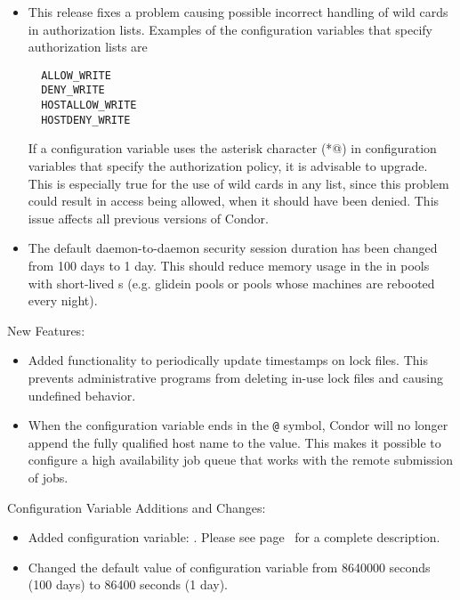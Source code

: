 \begin{itemize}

\item This release fixes a problem causing possible incorrect handling
of wild cards in authorization lists.
Examples of the configuration variables that specify
authorization lists are
\begin{verbatim}
  ALLOW_WRITE
  DENY_WRITE
  HOSTALLOW_WRITE
  HOSTDENY_WRITE
\end{verbatim}
If a configuration variable uses the asterisk character
(\verb@*@) in configuration variables that specify the
authorization policy, it is advisable to upgrade.
This is especially true for the 
use of wild cards in any  list,
since this problem could result in
access being allowed, when it should have been denied.
This issue affects all previous versions of Condor.

\item The default daemon-to-daemon security session duration has been
changed from 100 days to 1 day. This should reduce memory usage in the
 in pools with short-lived s (e.g. 
glidein pools or pools whose machines are rebooted every night).

\end{itemize}


\noindent New Features:

\begin{itemize}

\item Added functionality to periodically update timestamps on lock files. 
This prevents administrative programs from deleting in-use lock files and
causing undefined behavior.

\item When the configuration variable  ends in 
the \verb$@$ symbol,
Condor will no longer append the fully qualified
host name to the value.
This makes it possible to configure a high availability
job queue that works with the remote submission of jobs.

\end{itemize}

\noindent Configuration Variable Additions and Changes:

\begin{itemize}

\item Added configuration variable: .
Please see page~\pageref{param:LockFileUpdateInterval} for a complete
description.

\item Changed the default value of configuration variable
 from 8640000 seconds (100 days)
to 86400 seconds (1 day).

\end{itemize}


